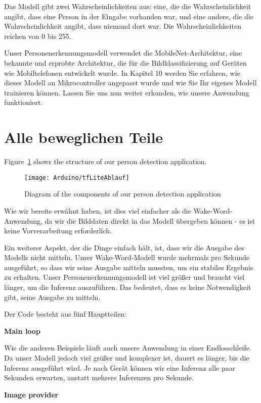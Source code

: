 Das Modell gibt zwei Wahrscheinlichkeiten aus: eine, die die Wahrscheinlichkeit angibt, dass eine Person in der Eingabe vorhanden war, und eine andere, die die Wahrscheinlichkeit angibt, dass niemand dort war. Die Wahrscheinlichkeiten reichen von 0 bis 255.

Unser Personenerkennungsmodell verwendet die MobileNet-Architektur, eine bekannte und erprobte Architektur, die für die Bildklassifizierung auf Geräten wie Mobiltelefonen entwickelt wurde. In Kapitel 10 werden Sie erfahren, wie dieses Modell an Mikrocontroller angepasst wurde und wie Sie Ihr eigenes Modell trainieren können. Lassen Sie uns nun weiter erkunden, wie unsere Anwendung funktioniert.


\section{Alle beweglichen Teile}


Figure~\ref{tflite:Ablauf} shows the structure of our person detection application.

\begin{figure}
  \centering
  \texttt{[image: Arduino/tfLiteAblauf]}
  \caption{Diagram of the components of our person detection application}\label{tflite:Ablauf}
\end{figure}

Wie wir bereits erwähnt haben, ist dies viel einfacher als die Wake-Word-Anwendung, da wir die Bilddaten direkt in das Modell übergeben können - es ist keine Vorverarbeitung erforderlich.

Ein weiterer Aspekt, der die Dinge einfach hält, ist, dass wir die Ausgabe des Modells nicht mitteln. Unser Wake-Word-Modell wurde mehrmals pro Sekunde ausgeführt, so dass wir seine Ausgabe mitteln mussten, um ein stabiles Ergebnis zu erhalten. Unser Personenerkennungsmodell ist viel größer und braucht viel länger, um die Inferenz auszuführen. Das bedeutet, dass es keine Notwendigkeit gibt, seine Ausgabe zu mitteln.

Der Code besteht aus fünf Hauptteilen:

\textbf{Main loop}

Wie die anderen Beispiele läuft auch unsere Anwendung in einer Endlosschleife. Da unser Modell jedoch viel größer und komplexer ist, dauert es länger, bis die Inferenz ausgeführt wird. Je nach Gerät können wir eine Inferenz alle paar Sekunden erwarten, anstatt mehrere Inferenzen pro Sekunde.

\textbf{Image provider}

